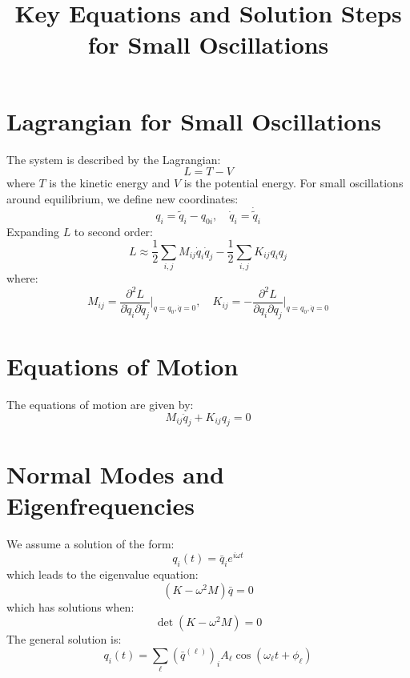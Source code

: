 \documentclass{article}
\begin{document}
\title{Key Equations and Solution Steps for Small Oscillations}
\author{}
\date{}
\maketitle

\section{Lagrangian for Small Oscillations}
The system is described by the Lagrangian:
\begin{equation}
L = T - V
\end{equation}
where \( T \) is the kinetic energy and \( V \) is the potential energy. For small oscillations around equilibrium, we define new coordinates:
\begin{equation}
q_i = \tilde{q}_i - q_{0i}, \quad \dot{q}_i = \dot{\tilde{q}}_i
\end{equation}
Expanding \( L \) to second order:
\begin{equation}
L \approx \frac{1}{2} \sum_{i,j} M_{ij} \dot{q}_i \dot{q}_j - \frac{1}{2} \sum_{i,j} K_{ij} q_i q_j
\end{equation}
where:
\begin{equation*}
M_{ij} = \frac{\partial^2 L}{\partial \dot{q}_i \partial \dot{q}_j} \Big|_{q = q_0, \dot{q} = 0}, \quad
K_{ij} = -\frac{\partial^2 L}{\partial q_i \partial q_j} \Big|_{q = q_0, \dot{q} = 0}
\end{equation*}

\section{Equations of Motion}
The equations of motion are given by:
\begin{equation}
M_{ij} \ddot{q}_j + K_{ij} q_j = 0
\end{equation}

\section{Normal Modes and Eigenfrequencies}
We assume a solution of the form:
\begin{equation}
q_i(t) = \bar{q}_i e^{i\omega t}
\end{equation}
which leads to the eigenvalue equation:
\begin{equation}
(K - \omega^2 M) \bar{q} = 0
\end{equation}
which has solutions when:
\begin{equation}
\det(K - \omega^2 M) = 0
\end{equation}
The general solution is:
\begin{equation}
q_i(t) = \sum_\ell (\bar{q}^{(\ell)})_i A_\ell \cos(\omega_\ell t + \phi_\ell)
\end{equation}
\end{document}
